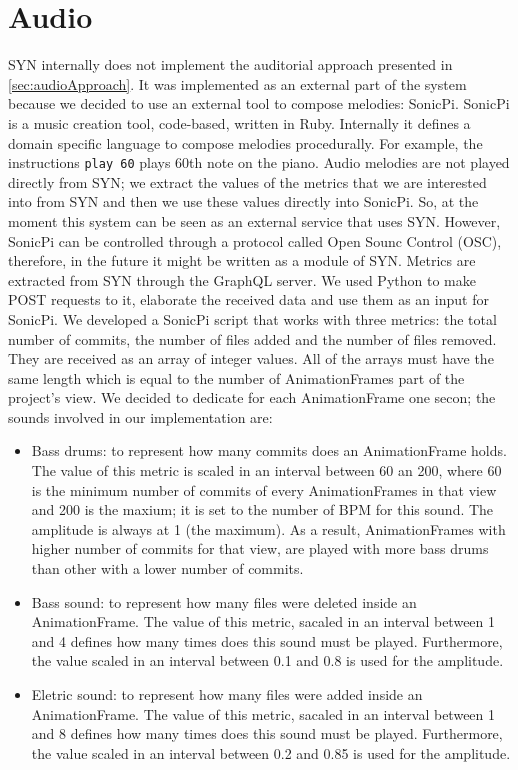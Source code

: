 \section{Audio}
SYN internally does not implement the auditorial approach presented in \autoref{sec:audioApproach}. It was implemented as an external part of the system because we decided to use an external tool to compose melodies: SonicPi. 
\bigbreak
SonicPi is a music creation tool, code-based, written in Ruby. Internally it defines a domain specific language to compose melodies procedurally. For example, the instructions \texttt{play 60} plays 60th note on the piano. Audio melodies are not played directly from SYN; we extract the values of the metrics that we are interested into from SYN and then we use these values directly into SonicPi. So, at the moment this system can be seen as an external service that uses SYN. However, SonicPi can be controlled through a protocol called Open Sounc Control (OSC), therefore, in the future it might be written as a module of SYN. 
\bigbreak
Metrics are extracted from SYN through the GraphQL server. We used Python to make POST requests to it, elaborate the received data and use them as an input for SonicPi. We developed a SonicPi script that works with three metrics: the total number of commits, the number of files added and the number of files removed. They are received as an array of integer values. All of the arrays must have the same length which is equal to the number of AnimationFrames part of the project's view. We decided to dedicate for each AnimationFrame one secon; the sounds involved in our implementation are:
\begin{itemize}
    \item Bass drums: to represent how many commits does an AnimationFrame holds. The value of this metric is scaled in an interval between 60 an 200, where 60 is the minimum number of commits of every AnimationFrames in that view and 200 is the maxium; it is set to the number of BPM for this sound. The amplitude is always at 1 (the maximum). As a result, AnimationFrames with higher number of commits for that view, are played with more bass drums than other with a lower number of commits.
    \item Bass sound: to represent how many files were deleted inside an AnimationFrame. The value of this metric, sacaled in an interval between 1 and 4 defines how many times does this sound must be played. Furthermore, the value scaled in an interval between 0.1 and 0.8 is used for the amplitude. 
    \item Eletric sound: to represent how many files were added inside an AnimationFrame. The value of this metric, sacaled in an interval between 1 and 8 defines how many times does this sound must be played. Furthermore, the value scaled in an interval between 0.2 and 0.85 is used for the amplitude. 
\end{itemize}

